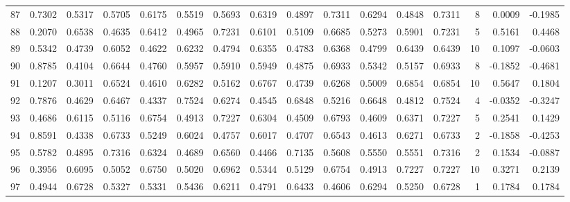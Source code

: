 \begin{tabular}{lrrrrrrrrrrrrrrr}
87  &      0.7302 &  0.5317 &  0.5705 &  0.6175 &  0.5519 &  0.5693 &  0.6319 &  0.4897 &  0.7311 &  0.6294 &   0.4848 &     0.7311 &      8 &                    0.0009 &                    -0.1985 \\
88  &      0.2070 &  0.6538 &  0.4635 &  0.6412 &  0.4965 &  0.7231 &  0.6101 &  0.5109 &  0.6685 &  0.5273 &   0.5901 &     0.7231 &      5 &                    0.5161 &                     0.4468 \\
89  &      0.5342 &  0.4739 &  0.6052 &  0.4622 &  0.6232 &  0.4794 &  0.6355 &  0.4783 &  0.6368 &  0.4799 &   0.6439 &     0.6439 &     10 &                    0.1097 &                    -0.0603 \\
90  &      0.8785 &  0.4104 &  0.6644 &  0.4760 &  0.5957 &  0.5910 &  0.5949 &  0.4875 &  0.6933 &  0.5342 &   0.5157 &     0.6933 &      8 &                   -0.1852 &                    -0.4681 \\
91  &      0.1207 &  0.3011 &  0.6524 &  0.4610 &  0.6282 &  0.5162 &  0.6767 &  0.4739 &  0.6268 &  0.5009 &   0.6854 &     0.6854 &     10 &                    0.5647 &                     0.1804 \\
92  &      0.7876 &  0.4629 &  0.6467 &  0.4337 &  0.7524 &  0.6274 &  0.4545 &  0.6848 &  0.5216 &  0.6648 &   0.4812 &     0.7524 &      4 &                   -0.0352 &                    -0.3247 \\
93  &      0.4686 &  0.6115 &  0.5116 &  0.6754 &  0.4913 &  0.7227 &  0.6304 &  0.4509 &  0.6793 &  0.4609 &   0.6371 &     0.7227 &      5 &                    0.2541 &                     0.1429 \\
94  &      0.8591 &  0.4338 &  0.6733 &  0.5249 &  0.6024 &  0.4757 &  0.6017 &  0.4707 &  0.6543 &  0.4613 &   0.6271 &     0.6733 &      2 &                   -0.1858 &                    -0.4253 \\
95  &      0.5782 &  0.4895 &  0.7316 &  0.6324 &  0.4689 &  0.6560 &  0.4466 &  0.7135 &  0.5608 &  0.5550 &   0.5551 &     0.7316 &      2 &                    0.1534 &                    -0.0887 \\
96  &      0.3956 &  0.6095 &  0.5052 &  0.6750 &  0.5020 &  0.6962 &  0.5344 &  0.5129 &  0.6754 &  0.4913 &   0.7227 &     0.7227 &     10 &                    0.3271 &                     0.2139 \\
97  &      0.4944 &  0.6728 &  0.5327 &  0.5331 &  0.5436 &  0.6211 &  0.4791 &  0.6433 &  0.4606 &  0.6294 &   0.5250 &     0.6728 &      1 &                    0.1784 &                     0.1784 \\

\end{tabular}
